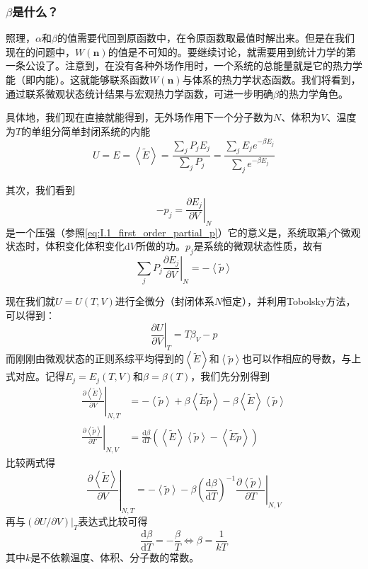 \documentclass[main.tex]{subfiles}
\begin{document}
\subsubsection{$\beta$是什么？}
照理，$\alpha$和$\beta$的值需要代回到原函数中，在令原函数取最值时解出来。但是在我们现在的问题中，$W\left(\mathbf{n}\right)$的值是不可知的。要继续讨论，就需要用到统计力学的第一条公设了。注意到，在没有各种外场作用时，一个系统的总能量就是它的热力学能（即内能）。这就能够联系函数$W\left(\mathbf{n}\right)$与体系的热力学状态函数。我们将看到，通过联系微观状态统计结果与宏观热力学函数，可进一步明确$\beta$的热力学角色。

具体地，我们现在直接就能得到，无外场作用下一个分子数为$N$、体积为$V$、温度为$T$的单组分简单封闭系统的内能
\[U=E=\left\langle\tilde{E}\right\rangle=\frac{\sum_jP_jE_j}{\sum_jP_j}=\frac{\sum_jE_je^{-\beta E_j}}{\sum_je^{-\beta E_j}}\]

其次，我们看到
\[-p_j=\left.\frac{\partial E_j}{\partial V}\right|_{N}\]
是一个压强（参照\eqref{eq:I.1_first_order_partial_p}）它的意义是，系统取第$j$个微观状态时，体积变化体积变化$\mathrm{d}V$所做的功。$p_j$是系统的微观状态性质，故有
\[\sum_jP_j\left.\frac{\partial E_j}{\partial V}\right|_{N}=-\left\langle\tilde{p}\right\rangle\]

现在我们就$U=U\left(T,V\right)$进行全微分（封闭体系$N$恒定），并利用Tobolsky方法，可以得到：
\[\left.\frac{\partial U}{\partial V}\right|_{T}=T\beta_V-p\]
而刚刚由微观状态的正则系综平均得到的$\left\langle\tilde{E}\right\rangle$和$\left\langle\tilde{p}\right\rangle$也可以作相应的导数，与上式对应。记得$E_j=E_j\left(T,V\right)$和$\beta=\beta\left(T\right)$，我们先分别得到
\begin{align*}
    \left.\frac{\partial\left\langle\tilde{E}\right\rangle}{\partial V}\right|_{N,T} & =-\left\langle\tilde{p}\right\rangle+\beta\left\langle\tilde{E}\tilde{p}\right\rangle-\beta\left\langle\tilde{E}\right\rangle\left\langle\tilde{p}\right\rangle   \\
    \left.\frac{\partial\left\langle\tilde{p}\right\rangle}{\partial T}\right|_{N,V} & =\frac{\mathrm{d}\beta}{\mathrm{d}T}\left(\left\langle\tilde{E}\right\rangle\left\langle\tilde{p}\right\rangle-\left\langle\tilde{E}\tilde{p}\right\rangle\right)
\end{align*}
比较两式得
\[\left.\frac{\partial\left\langle\tilde{E}\right\rangle}{\partial V}\right|_{N,T}=-\left\langle\tilde{p}\right\rangle-\beta\left(\frac{\mathrm{d}\beta}{\mathrm{d}T}\right)^{-1}\left.\frac{\partial\left\langle\tilde{p}\right\rangle}{\partial T}\right|_{N,V}\]
再与$\left(\partial U/\partial V\right)|_{T}$表达式比较可得
\[\frac{\mathrm{d}\beta}{\mathrm{d}T}=-\frac{\beta}{T}\Leftrightarrow\beta=\frac{1}{kT}\]
其中$k$是不依赖温度、体积、分子数的常数。
\end{document}
